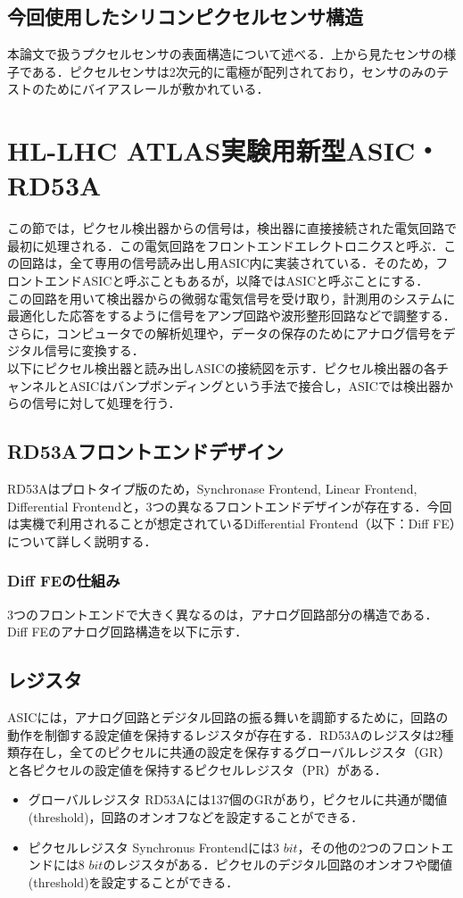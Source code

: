 \subsection{今回使用したシリコンピクセルセンサ構造}
本論文で扱うプクセルセンサの表面構造について述べる．上から見たセンサの様子である．ピクセルセンサは2次元的に電極が配列されており，センサのみのテストのためにバイアスレールが敷かれている．


\section{HL-LHC ATLAS実験用新型ASIC・RD53A}
この節では，ピクセル検出器からの信号は，検出器に直接接続された電気回路で最初に処理される．この電気回路をフロントエンドエレクトロニクスと呼ぶ．この回路は，全て専用の信号読み出し用ASIC内に実装されている．そのため，フロントエンドASICと呼ぶこともあるが，以降ではASICと呼ぶことにする．\\
この回路を用いて検出器からの微弱な電気信号を受け取り，計測用のシステムに最適化した応答をするように信号をアンプ回路や波形整形回路などで調整する．さらに，コンピュータでの解析処理や，データの保存のためにアナログ信号をデジタル信号に変換する．\\
以下にピクセル検出器と読み出しASICの接続図を示す．ピクセル検出器の各チャンネルとASICはバンプボンディングという手法で接合し，ASICでは検出器からの信号に対して処理を行う．\\

\subsection{RD53Aフロントエンドデザイン}
RD53Aはプロトタイプ版のため，Synchronase Frontend, Linear Frontend, Differential Frontendと，3つの異なるフロントエンドデザインが存在する．今回は実機で利用されることが想定されているDifferential Frontend（以下：Diff FE）について詳しく説明する．

\subsubsection{Diff FEの仕組み}
3つのフロントエンドで大きく異なるのは，アナログ回路部分の構造である．Diff FEのアナログ回路構造を以下に示す．\\

\subsection{レジスタ}
ASICには，アナログ回路とデジタル回路の振る舞いを調節するために，回路の動作を制御する設定値を保持するレジスタが存在する．RD53Aのレジスタは2種類存在し，全てのピクセルに共通の設定を保存するグローバルレジスタ（GR）と各ピクセルの設定値を保持するピクセルレジスタ（PR）がある．
\begin{itemize}
\item グローバルレジスタ
  RD53Aには137個のGRがあり，ピクセルに共通が閾値(threshold)，回路のオンオフなどを設定することができる．
\item ピクセルレジスタ
  Synchronus Frontendには3 $bit$，その他の2つのフロントエンドには8 $bit$のレジスタがある．ピクセルのデジタル回路のオンオフや閾値(threshold)を設定することができる．
\end{itemize}


